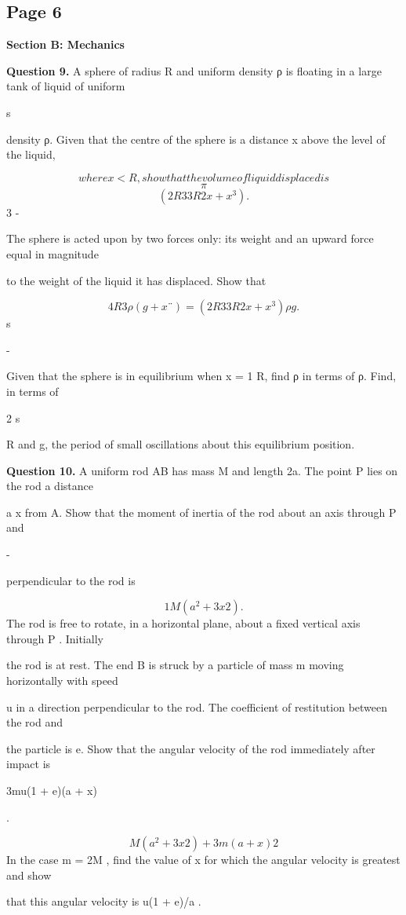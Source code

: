 \documentclass[12pt]{article}
\begin{document}
\subsection*{Page 6}
\begin{flushleft}
\bigskip\textbf{Section B: Mechanics}\par
\bigskip\textbf{Question 9.} A sphere of radius R and uniform density ρ is floating in a large tank of liquid of uniform\par
s\par
density ρ. Given that the centre of the sphere is a distance x above the level of the liquid,\par
\[where x < R, show that the volume of liquid displaced is\]
\[\pi\]
\[(2R3 3R2x + x^3) .\]
3 -\par
The sphere is acted upon by two forces only: its weight and an upward force equal in magnitude\par
to the weight of the liquid it has displaced. Show that\par
\[4R3ρ (g + x¨) = (2R3 3R2x + x^3)ρg .\]
s\par
-\par
Given that the sphere is in equilibrium when x = 1 R, find ρ in terms of ρ. Find, in terms of\par
2 s\par
R and g, the period of small oscillations about this equilibrium position.\par
\bigskip\textbf{Question 10.} A uniform rod AB has mass M and length 2a. The point P lies on the rod a distance\par
a x from A. Show that the moment of inertia of the rod about an axis through P and\par
-\par
perpendicular to the rod is\par
\[1 M (a^2 + 3x2) .\]
The rod is free to rotate, in a horizontal plane, about a fixed vertical axis through P . Initially\par
the rod is at rest. The end B is struck by a particle of mass m moving horizontally with speed\par
u in a direction perpendicular to the rod. The coefficient of restitution between the rod and\par
the particle is e. Show that the angular velocity of the rod immediately after impact is\par
3mu(1 + e)(a + x)\par
.\par
\[M (a^2 + 3x2) + 3m(a + x)2\]
In the case m = 2M , find the value of x for which the angular velocity is greatest and show\par
that this angular velocity is u(1 + e)/a .\par
\end{flushleft}
\end{document}
